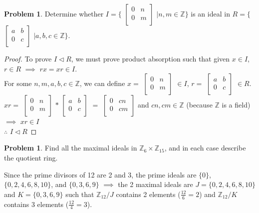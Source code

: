 \documentclass[11pt]{article}
\theoremstyle{definition}
\newtheorem{prob}[thm]{Problem}
\numberwithin{equation}{section}
\newcommand{\Z}{\mathbb{Z}}
\begin{document}
\begin{prob}
Determine whether $I = \{$
$\begin{bmatrix}
0   &n\\
0   &m\\
\end{bmatrix}$
$\mid n, m \in \Z\}$ is an ideal in $R = \{$
$\begin{bmatrix}
a   &b\\
0   &c\\
\end{bmatrix}$
$\mid a, b, c \in \Z\}$.
\end{prob}
\begin{proof}
To prove $I \vartriangleleft R$, we must prove product absorption such that given $x \in I$, $r \in R$ $\implies$ $rx = xr \in I$.\\
For some $n, m, a, b, c \in \Z$, we can define $x = $
$\begin{bmatrix}
0   &n\\
0   &m\\
\end{bmatrix}$ $\in I$, $r = $
$\begin{bmatrix}
a   &b\\
0   &c\\
\end{bmatrix}$ $\in R$.\\
$xr = $
$\begin{bmatrix}
0   &n\\
0   &m\\
\end{bmatrix}$
$*$
$\begin{bmatrix}
a   &b\\
0   &c\\
\end{bmatrix}$
$=$
$\begin{bmatrix}
0   &cn\\
0   &cm\\
\end{bmatrix}$ and $cn, cm \in \Z$ (because $\Z$ is a field) $\implies$ $xr \in I$\\
$\therefore$ $I \vartriangleleft R$
\end{proof}

\begin{prob}
Find all the maximal ideals in $\Z_{6} \times \Z_{15}$, and in each case describe the quotient ring.
\end{prob}

Since the prime divisors of 12 are 2 and 3, the prime ideals are $\{0\}$, $\{0, 2, 4, 6, 8, 10\}$, and $\{0, 3, 6, 9\}$ $\implies$ the 2 maximal ideals are $J = \{0, 2, 4, 6, 8, 10\}$ and $K = \{0, 3, 6, 9\}$ such that $\Z_{12}/J$ contains 2 elements ($\frac{12}{6} = 2$) and $\Z_{12}/K$ contains 3 elements ($\frac{12}{4} = 3$).
\end{document}
